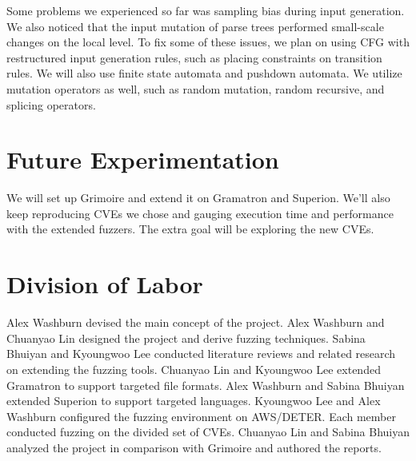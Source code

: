 \documentclass[12pt]{diazessay}
\begin{document}
Some problems we experienced so far was sampling bias during input generation. We also noticed that the input mutation of parse trees performed small-scale changes on the local level. To fix some of these issues, we plan on using CFG with restructured input generation rules, such as placing constraints on transition rules. We will also use finite state automata and pushdown automata. We utilize mutation operators as well, such as random mutation, random recursive, and splicing operators.

\section*{Future Experimentation}
We will set up Grimoire and extend it on Gramatron and Superion. We'll also keep reproducing CVEs we chose and gauging execution time and performance with the extended fuzzers.
The extra goal will be exploring the new CVEs.

\section*{Division of Labor}

Alex Washburn devised the main concept of the project.
Alex Washburn and Chuanyao Lin designed the project and derive fuzzing techniques.
Sabina Bhuiyan and Kyoungwoo Lee conducted literature reviews and related research on extending the fuzzing tools.
Chuanyao Lin and Kyoungwoo Lee extended Gramatron to support targeted file formats.
Alex Washburn and Sabina Bhuiyan extended Superion to support targeted languages.
Kyoungwoo Lee and Alex Washburn configured the fuzzing environment on AWS/DETER.
Each member conducted fuzzing on the divided set of CVEs.
Chuanyao Lin and Sabina Bhuiyan analyzed the project in comparison with Grimoire and authored the reports.

\clearpage


\end{document}
